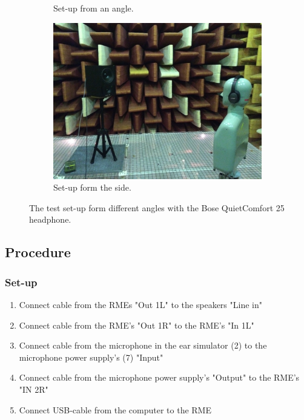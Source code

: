 \begin{figure}[H]
\begin{subfigure}[b]{0.4\textwidth}
		\caption{Set-up from an angle.}
		\vspace{2ex}
		\includegraphics[width=\textwidth]{../Journal/Experiments/TestofConsumerHeadphones/Pictures/OtherBrandsSetupSide.jpg}
		\caption{Set-up form the side.}
	\end{subfigure}
	\caption{The test set-up form different angles with the Bose QuietComfort 25 headphone.}
\label{fig:OtherBrandsPicture}
\end{figure}


\subsection{Procedure}
	\subsubsection{Set-up}
	\begin{enumerate}
		\item Connect cable from the RMEs "Out 1L" to the speakers "Line in"
		\item Connect cable from the RME's "Out 1R" to the RME's "In 1L"
		\item Connect cable from the microphone in the ear simulator (2) to the microphone power supply's (7) "Input"
		\item Connect cable from the microphone power supply's "Output" to the RME's "IN 2R"
		\item Connect USB-cable from the computer to the RME
	\end{enumerate}

